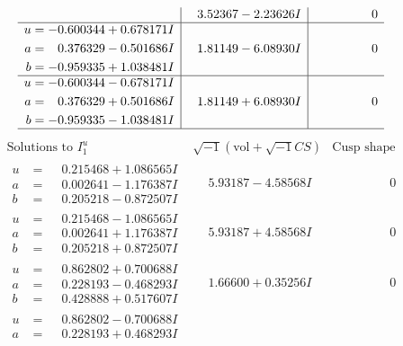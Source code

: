\documentclass[1p]{elsarticle_modified}
\theoremstyle{definition}
\newcommand{\I}{\sqrt{-1}}
\begin{document}
$$\begin{array}{c|c|c}
 & \phantom{-}3.52367 - 2.23626 I & \phantom{-0.000000 } 0 \\ \hline\begin{aligned}
u &= -0.600344 + 0.678171 I \\
a &= \phantom{-}0.376329 - 0.501686 I \\
b &= -0.959335 + 1.038481 I\end{aligned}
 & \phantom{-}1.81149 - 6.08930 I & \phantom{-0.000000 } 0 \\ \hline\begin{aligned}
u &= -0.600344 - 0.678171 I \\
a &= \phantom{-}0.376329 + 0.501686 I \\
b &= -0.959335 - 1.038481 I\end{aligned}
 & \phantom{-}1.81149 + 6.08930 I & \phantom{-0.000000 } 0\\
 \hline 
 \end{array}$$\newpage$$\begin{array}{c|c|c}  
\text{Solutions to }I^u_{1}& \I (\text{vol} + \sqrt{-1}CS) & \text{Cusp shape}\\
 \hline 
\begin{aligned}
u &= \phantom{-}0.215468 + 1.086565 I \\
a &= \phantom{-}0.002641 - 1.176387 I \\
b &= \phantom{-}0.205218 - 0.872507 I\end{aligned}
 & \phantom{-}5.93187 - 4.58568 I & \phantom{-0.000000 } 0 \\ \hline\begin{aligned}
u &= \phantom{-}0.215468 - 1.086565 I \\
a &= \phantom{-}0.002641 + 1.176387 I \\
b &= \phantom{-}0.205218 + 0.872507 I\end{aligned}
 & \phantom{-}5.93187 + 4.58568 I & \phantom{-0.000000 } 0 \\ \hline\begin{aligned}
u &= \phantom{-}0.862802 + 0.700688 I \\
a &= \phantom{-}0.228193 - 0.468293 I \\
b &= \phantom{-}0.428888 + 0.517607 I\end{aligned}
 & \phantom{-}1.66600 + 0.35256 I & \phantom{-0.000000 } 0 \\ \hline\begin{aligned}
u &= \phantom{-}0.862802 - 0.700688 I \\
a &= \phantom{-}0.228193 + 0.468293 I \\

\end{aligned}
\end{array}$$
\end{document}
